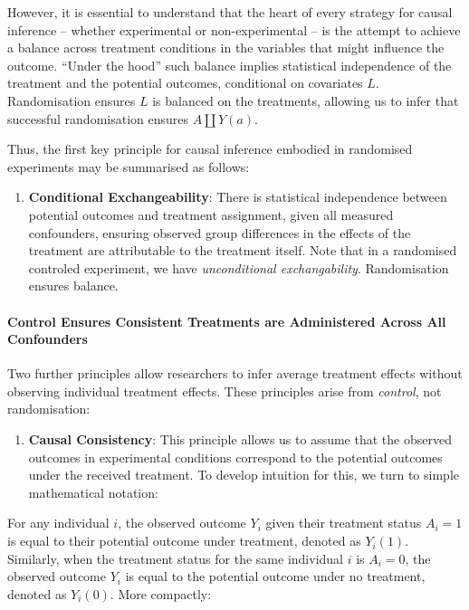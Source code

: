 \documentclass[
  singlecolumn]{article}
\let\oldparagraph\paragraph
\renewcommand{\paragraph}[1]{\oldparagraph{#1}\mbox{}}
\providecommand{\tightlist}{%
  \setlength{\itemsep}{0pt}\setlength{\parskip}{0pt}}\usepackage{longtable,booktabs,array}
\begin{document}
However, it is essential to understand that the heart of every strategy
for causal inference -- whether experimental or non-experimental -- is
the attempt to achieve a balance across treatment conditions in the
variables that might influence the outcome. ``Under the hood'' such
balance implies statistical independence of the treatment and the
potential outcomes, conditional on covariates \(L\). Randomisation
ensures \(L\) is balanced on the treatments, allowing us to infer that
successful randomisation ensures \(A \coprod Y(a)\).

Thus, the first key principle for causal inference embodied in
randomised experiments may be summarised as follows:

\begin{enumerate}
\def\labelenumi{\arabic{enumi}.}
\tightlist
\item
  \textbf{Conditional Exchangeability}: There is statistical
  independence between potential outcomes and treatment assignment,
  given all measured confounders, ensuring observed group differences in
  the effects of the treatment are attributable to the treatment itself.
  Note that in a randomised controled experiment, we have
  \emph{unconditional exchangability}. Randomisation ensures balance.
\end{enumerate}

\paragraph{Control Ensures Consistent Treatments are Administered Across
All
Confounders}\label{control-ensures-consistent-treatments-are-administered-across-all-confounders}

Two further principles allow researchers to infer average treatment
effects without observing individual treatment effects. These principles
arise from \emph{control}, not randomisation:

\begin{enumerate}
\def\labelenumi{\arabic{enumi}.}
\setcounter{enumi}{1}
\tightlist
\item
  \textbf{Causal Consistency}: This principle allows us to assume that
  the observed outcomes in experimental conditions correspond to the
  potential outcomes under the received treatment. To develop intuition
  for this, we turn to simple mathematical notation:
\end{enumerate}

For any individual \(i\), the observed outcome \(Y_i\) given their
treatment status \(A_i = 1\) is equal to their potential outcome under
treatment, denoted as \(Y_i(1)\). Similarly, when the treatment status
for the same individual \(i\) is \(A_i = 0\), the observed outcome
\(Y_i\) is equal to the potential outcome under no treatment, denoted as
\(Y_i(0)\). More compactly:
\end{document}
